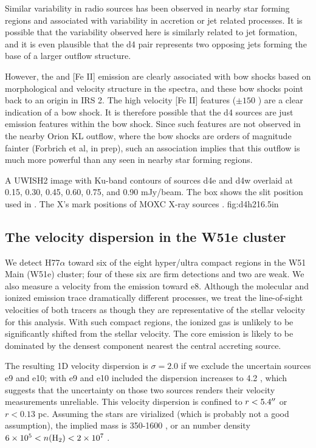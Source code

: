 Similar variability in radio sources has been observed in nearby star forming
regions \citep{Liu2014c,Forbrich2013a} and associated with variability in
accretion or jet related processes.  It is possible that the variability
observed here is similarly related to jet formation, and it is even plausible
that the d4 pair represents two opposing jets forming the base of a larger
outflow structure.

However, the \hh and [Fe II] emission are clearly associated with bow shocks
based on morphological and velocity structure in the \citet{Hodapp2002a}
spectra, and these bow shocks point back to an origin in IRS 2.  The high
velocity [Fe II] features ($\pm150$ \kms) are a clear indication of a bow
shock.  It is therefore possible that the d4 sources are just emission features
within the bow shock.  Since such features are not observed in the nearby Orion
KL outflow, where the bow shocks are orders of magnitude fainter (Forbrich et
al, in prep), such an association implies that this outflow is much more
powerful than any seen in nearby star forming regions.

{A UWISH2 \hh image with Ku-band contours of sources d4e and d4w overlaid at
0.15, 0.30, 0.45, 0.60, 0.75, and 0.90 mJy/beam.  The box shows the slit
position used in \citet{Hodapp2002a}.  The X's mark positions of MOXC X-ray
sources \citep{Townsley2014a}.
}
{fig:d4h2}{1}{6.5in}

\subsection{The velocity dispersion in the W51e cluster}
\label{sec:vdisp}
We detect H77$\alpha$ toward six of the eight hyper/ultra compact \hii regions
in the W51 Main (W51e) cluster; four of these six are firm detections and two
are weak.  We also measure a velocity from the \formaldehyde emission toward
e8.  Although the molecular and ionized emission trace dramatically different
processes, we treat the line-of-sight velocities of both tracers as though they
are representative of the stellar velocity for this analysis.  With such
compact \hii regions, the ionized gas is unlikely to be significantly shifted
from the stellar velocity.  The core emission is likely to be dominated by the
densest component nearest the central accreting source.

The resulting 1D velocity dispersion is $\sigma=2.0$ \kms if we exclude
the uncertain sources e9
and e10; with e9 and e10 included the dispersion increases to 4.2 \kms, which
suggests that the uncertainty on those two sources renders their velocity
measurements unreliable.  This velocity dispersion is confined to
$r<5.4\mbox{$^{\prime\prime}$}$ or $r<0.13$ pc.  Assuming the stars are virialized (which is
probably not a good assumption), the implied mass is 350-1600 \msun, or an \hh
number density $6\times10^{5} < n(\textrm{H}_{2}) < 2\times10^{7}$ \percc.

